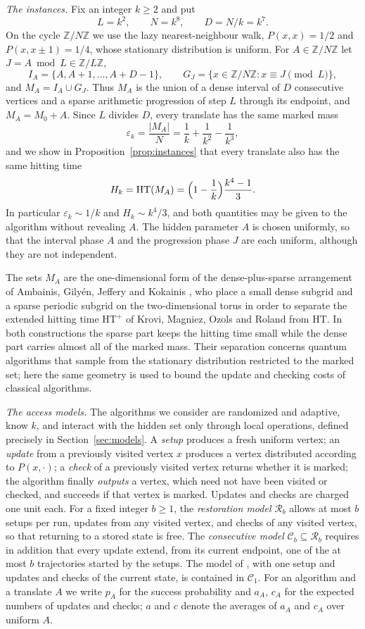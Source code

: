 \documentclass{amsart}
\theoremstyle{plain}
\theoremstyle{definition}
\theoremstyle{remark}
\newcommand{\Z}{\mathbb{Z}}
\newcommand{\eps}{\varepsilon}
\newcommand{\res}{\mathcal{R}}
\newcommand{\con}{\mathcal{C}}
\newcommand{\HT}{\mathrm{HT}}
\begin{document}
\emph{The instances.}
Fix an integer $k\ge 2$ and put
\[
L=k^2,\qquad N=k^8,\qquad D=N/k=k^7 .
\]
On the cycle $\Z/N\Z$ we use the lazy nearest-neighbour walk, $P(x,x)=1/2$ and $P(x,x\pm 1)=1/4$, whose stationary distribution is uniform. For $A\in\Z/N\Z$ let $J=A\bmod L\in\Z/L\Z$,
\[
I_A=\{A,A+1,\dots,A+D-1\},\qquad G_J=\{x\in\Z/N\Z: x\equiv J\pmod L\},
\]
and $M_A=I_A\cup G_J$. Thus $M_A$ is the union of a dense interval of $D$ consecutive vertices and a sparse arithmetic progression of step $L$ through its endpoint, and $M_A=M_0+A$. Since $L$ divides $D$, every translate has the same marked mass
\[
\eps_k=\frac{|M_A|}{N}=\frac1k+\frac1{k^2}-\frac1{k^3},
\]
and we show in Proposition~\ref{prop:instances} that every translate also has the same hitting time
\[
H_k=\HT(M_A)=\Bigl(1-\frac1k\Bigr)\frac{k^4-1}{3}.
\]
In particular $\eps_k\sim 1/k$ and $H_k\sim k^4/3$, and both quantities may be given to the algorithm without revealing $A$. The hidden parameter $A$ is chosen uniformly, so that the interval phase $A$ and the progression phase $J$ are each uniform, although they are not independent.

The sets $M_A$ are the one-dimensional form of the dense-plus-sparse arrangement of Ambainis, Gilyén, Jeffery and Kokainis \cite[Section~5, Lemma~10]{AGJK}, who place a small dense subgrid and a sparse periodic subgrid on the two-dimensional torus in order to separate the extended hitting time $\HT^+$ of Krovi, Magniez, Ozols and Roland \cite{KMOR} from $\HT$. In both constructions the sparse part keeps the hitting time small while the dense part carries almost all of the marked mass. Their separation concerns quantum algorithms that sample from the stationary distribution restricted to the marked set; here the same geometry is used to bound the update and checking costs of classical algorithms.

\emph{The access models.}
The algorithms we consider are randomized and adaptive, know $k$, and interact with the hidden set only through local operations, defined precisely in Section~\ref{sec:models}. A \emph{setup} produces a fresh uniform vertex; an \emph{update} from a previously visited vertex $x$ produces a vertex distributed according to $P(x,\cdot)$; a \emph{check} of a previously visited vertex returns whether it is marked; the algorithm finally \emph{outputs} a vertex, which need not have been visited or checked, and succeeds if that vertex is marked. Updates and checks are charged one unit each. For a fixed integer $b\ge 1$, the \emph{restoration model} $\res_b$ allows at most $b$ setups per run, updates from any visited vertex, and checks of any visited vertex, so that returning to a stored state is free. The \emph{consecutive model} $\con_b\subseteq\res_b$ requires in addition that every update extend, from its current endpoint, one of the at most $b$ trajectories started by the setups. The model of \cite[Section~3]{AC}, with one setup and updates and checks of the current state, is contained in $\con_1$. For an algorithm and a translate $A$ we write $p_A$ for the success probability and $a_A$, $c_A$ for the expected numbers of updates and checks; $a$ and $c$ denote the averages of $a_A$ and $c_A$ over uniform $A$.
\end{document}
